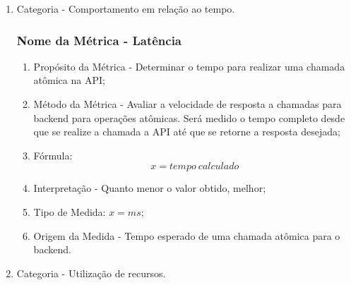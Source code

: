 \documentclass[conference]{IEEEtran}
\begin{document}
\begin{enumerate}
\item Categoria - Comportamento em relação ao tempo.
\subsubsection{Nome da Métrica - Latência}\label{BB}
\begin{enumerate}
\item Propósito da Métrica - Determinar o tempo para realizar uma chamada atômica na API;
\item Método da Métrica - Avaliar a velocidade de resposta a chamadas para backend para operações atômicas. Será medido o tempo completo desde que se realize a chamada a API até que se retorne a resposta desejada;
\item Fórmula:
\begin{equation}
x = tempo\ calculado\label{eq:latencia}
\end{equation}
\item Interpretação - Quanto menor o valor obtido, melhor;
\item Tipo de Medida: $x = ms$;
\item Origem da Medida - Tempo esperado de uma chamada atômica para o backend.
\end{enumerate}
\item Categoria - Utilização de recursos.

\end{enumerate}
\end{document}
